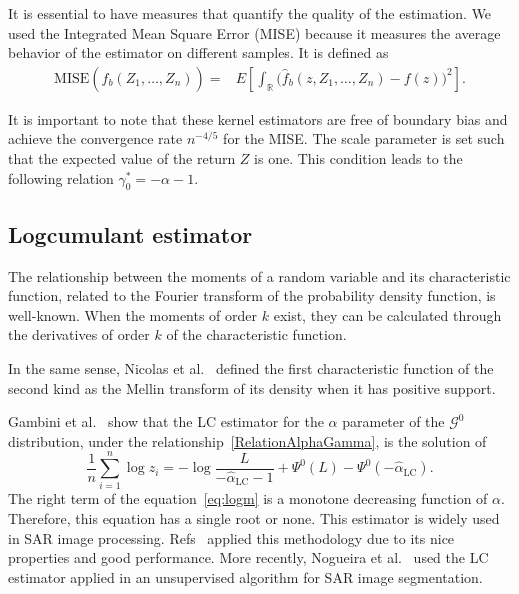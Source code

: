 \documentclass[twocolumn]{svjour3}
\begin{document}
It is essential to have measures that quantify the quality of the estimation. 
We used the Integrated Mean Square Error (MISE) because it measures the average behavior of the estimator on different samples. 
It is defined as
\begin{align}
	\label{Mise}
	\text{MISE}(\widehat{f}_b(Z_1,\ldots,Z_n))=&E\left[\int_\mathbb{R} \big(\widehat{f}_b(z,Z_1,\ldots,Z_n)-f(z)\big)^2 \right].
\end{align}

It is important to note that these kernel estimators are free of boundary bias and achieve the convergence rate $n^{-4/5}$ for the MISE.
The scale parameter is set such that the expected value of the return $Z$ is one. 
This condition leads to the following relation $\gamma_0^*=-\alpha-1$.

\subsection{Logcumulant estimator}\label{lc}

The relationship between the moments of a random variable and its characteristic function, related to the Fourier transform of the probability density function, is well-known. 
When the moments of order $k$ exist, they can be calculated through the derivatives of order $k$ of the characteristic function.

In the same sense, Nicolas et al.~\cite{nicolas2002} defined the first characteristic function of the second kind as the Mellin transform of its density when it has positive support. 

Gambini et al.~\cite{gambini2015} show that the LC estimator for the $\alpha$ parameter of the $\mathcal{G}^0$ distribution, under the relationship~\eqref{RelationAlphaGamma}, is the solution of 
\begin{equation} \label{eq:logm}
	\frac{1}{n} \sum_{i=1}^n\log z_i =   -\log \frac{L}{-\widehat\alpha_{\text{{LC}}}-1} + \Psi^0(L) - \Psi^0(-\widehat\alpha_{\text{{LC}}}).
\end{equation}
The right term of the equation~\eqref{eq:logm} is a monotone decreasing function of $\alpha$. Therefore, this equation has a single root or none. 
This estimator is widely used in SAR image processing. 
Refs~\cite{MellinAnalysisPolSAR,BujorTrouveValetNicolas2004,khan2014} applied this methodology due to its nice properties and good performance. 
More recently, Nogueira et al.~\cite{Nogueira2019} used the LC estimator applied in an unsupervised algorithm for SAR image segmentation.
\end{document}
